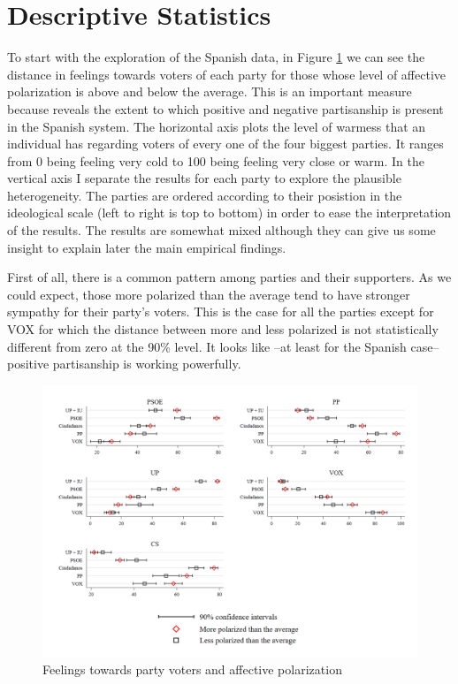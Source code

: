 \documentclass[a4paper, svgnames]{article}
\begin{document}
\section{Descriptive Statistics}
\label{section:descriptive}
To start with the exploration of the Spanish data, in Figure \ref*{fig:feelings} we can see the distance in feelings towards voters of each party for those whose level of affective polarization is above and below the average. This is an important measure because reveals the extent to which positive and negative partisanship is present in the Spanish system. The horizontal axis plots the level of warmess that an individual has regarding voters of every one of the four biggest parties. It ranges from 0 being feeling very cold to 100 being feeling very close or warm. In the vertical axis I separate the results for each party to explore the plausible heterogeneity. The parties are ordered according to their posistion in the ideological scale (left to right is top to bottom) in order to ease the interpretation of the results. The results are somewhat mixed although they can give us some insight to explain later the main empirical findings. 

First of all, there is a common pattern among parties and their supporters. As we could expect, those more polarized than the average tend to have stronger sympathy for their party's voters. This is the case for all the parties except for VOX for which the distance between more and less polarized is not statistically different from zero at the 90\% level. It looks like --at least for the Spanish case-- positive partisanship is working powerfully.

\begin{figure}[H]
	\centering
	\includegraphics[scale=0.35]{Figures/combinedfeelingsAP.png}
	\caption{\label{fig:feelings} Feelings towards party voters and affective polarization}
\end{figure}
\end{document}

